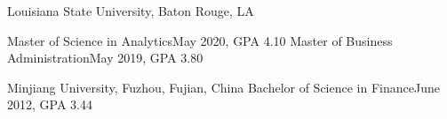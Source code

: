 \documentclass[10pt,a4paper]{article}
\begin{document}

\spacedhrule{0em}{-1em}

%
%


\headedsection
{Louisiana State University, Baton Rouge, LA}
{}
{

  \headedsubsection
  {Master of Science in Analytics}{May 2020, GPA 4.10}{}
  \headedsubsection
  {Master of Business Administration}{May 2019, GPA 3.80}{}
}
\vspace{0.1em}
\headedsection
{Minjiang University, Fuzhou, Fujian, China}{
	\headedsubsection
  {Bachelor of Science in Finance}{June 2012, GPA 3.44}{}
}


\end{document}
